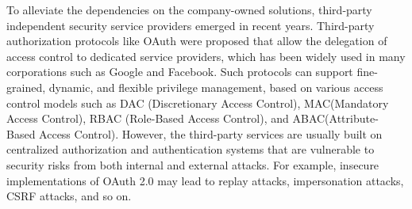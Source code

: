 To alleviate the dependencies on the company-owned solutions, third-party independent security service providers emerged in recent years. Third-party authorization protocols like OAuth were proposed that allow the delegation of access control to dedicated service providers, which has been widely used in many corporations such as Google and Facebook. Such protocols can support fine-grained, dynamic, and flexible privilege management, based on various access control models such as DAC (Discretionary Access Control), MAC(Mandatory Access Control), RBAC (Role-Based Access Control), and ABAC(Attribute-Based Access Control). However, the third-party services are usually built on centralized authorization and authentication systems that are vulnerable to security risks from both internal and external attacks. For example, insecure implementations of OAuth 2.0 may lead to replay attacks, impersonation attacks, CSRF attacks, and so on.